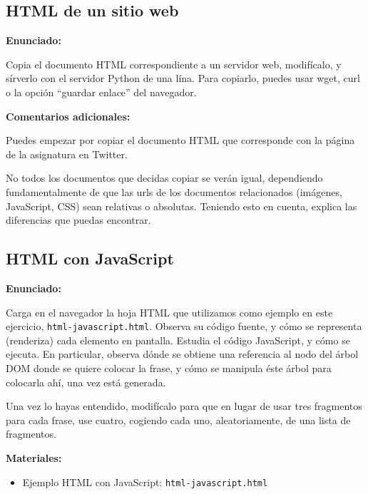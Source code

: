 \subsection{HTML de un sitio web}
\label{subsec:eje-html-web}

\textbf{Enunciado:}

Copia el documento HTML correspondiente a un servidor web, modifícalo, y sírverlo con el servidor Python de una lína. Para copiarlo, puedes usar wget, curl o la opción ``guardar enlace'' del navegador.

\textbf{Comentarios adicionales:}

Puedes empezar por copiar el documento HTML que corresponde con la página de la asignatura en Twitter.

No todos los documentos que decidas copiar se verán igual, dependiendo fundamentalmente de que las urls de los documentos relacionados (imágenes, JavaScript, CSS) sean relativas o absolutas. Teniendo esto en cuenta, explica las diferencias que puedas encontrar.

\subsection{HTML con JavaScript}
\label{subsec:eje-html-javascript}

\textbf{Enunciado:}

Carga en el navegador la hoja HTML que utilizamos como ejemplo en este ejercicio, \verb|html-javascript.html|. Observa su código fuente, y cómo se representa (renderiza) cada elemento en pantalla. Estudia el código JavaScript, y cómo se ejecuta. En particular, observa dónde se obtiene una referencia al nodo del árbol DOM donde se quiere colocar la frase, y cómo se manipula éste árbol para colocarla ahí, una vez está generada.

Una vez lo hayas entendido, modifícalo para que en lugar de usar tres fragmentos para cada frase, use cuatro, cogiendo cada uno, aleatoriamente, de una lista de fragmentos.

\textbf{Materiales:}

\begin{itemize}
\item Ejemplo HTML con JavaScript: \verb|html-javascript.html|
\end{itemize}


